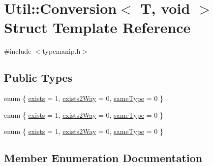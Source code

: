 \hypertarget{structUtil_1_1Conversion_3_01T_00_01void_01_4}{}\section{Util\+:\+:Conversion$<$ T, void $>$ Struct Template Reference}
\label{structUtil_1_1Conversion_3_01T_00_01void_01_4}


{\ttfamily \#include $<$typemanip.\+h$>$}

\subsection*{Public Types}
\begin{DoxyCompactItemize}
\item 
enum \{ \mbox{\hyperlink{structUtil_1_1Conversion_3_01T_00_01void_01_4_af0a0a8863eaba53ded7fc8e954d563d0abe46fa6f8757b0105eb5681c5ab0e0fd}{exists}} = 1, 
\mbox{\hyperlink{structUtil_1_1Conversion_3_01T_00_01void_01_4_af0a0a8863eaba53ded7fc8e954d563d0a4df0ad18c9bf2040ae6ab554174fe7f4}{exists2\+Way}} = 0, 
\mbox{\hyperlink{structUtil_1_1Conversion_3_01T_00_01void_01_4_af0a0a8863eaba53ded7fc8e954d563d0a9af8d89278860cc09d47edd6306a8b65}{same\+Type}} = 0
 \}
\item 
enum \{ \mbox{\hyperlink{structUtil_1_1Conversion_3_01T_00_01void_01_4_af0a0a8863eaba53ded7fc8e954d563d0abe46fa6f8757b0105eb5681c5ab0e0fd}{exists}} = 1, 
\mbox{\hyperlink{structUtil_1_1Conversion_3_01T_00_01void_01_4_af0a0a8863eaba53ded7fc8e954d563d0a4df0ad18c9bf2040ae6ab554174fe7f4}{exists2\+Way}} = 0, 
\mbox{\hyperlink{structUtil_1_1Conversion_3_01T_00_01void_01_4_af0a0a8863eaba53ded7fc8e954d563d0a9af8d89278860cc09d47edd6306a8b65}{same\+Type}} = 0
 \}
\item 
enum \{ \mbox{\hyperlink{structUtil_1_1Conversion_3_01T_00_01void_01_4_af0a0a8863eaba53ded7fc8e954d563d0abe46fa6f8757b0105eb5681c5ab0e0fd}{exists}} = 1, 
\mbox{\hyperlink{structUtil_1_1Conversion_3_01T_00_01void_01_4_af0a0a8863eaba53ded7fc8e954d563d0a4df0ad18c9bf2040ae6ab554174fe7f4}{exists2\+Way}} = 0, 
\mbox{\hyperlink{structUtil_1_1Conversion_3_01T_00_01void_01_4_af0a0a8863eaba53ded7fc8e954d563d0a9af8d89278860cc09d47edd6306a8b65}{same\+Type}} = 0
 \}
\end{DoxyCompactItemize}


\subsection{Member Enumeration Documentation}
\mbox{\label{structUtil_1_1Conversion_3_01T_00_01void_01_4_a5d15302ce24b3dcd75608429c916feb8}} 

